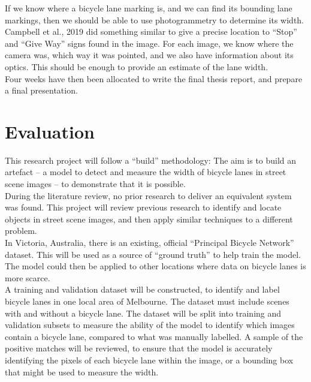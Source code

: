 \documentclass{article}
\begin{document}
If we know where a bicycle lane marking is, and we can find its bounding lane markings, then we should be able to use photogrammetry to determine its width.  Campbell et al., 2019 \cite{CAMPBELL2019101350} did something similar to give a precise location to ``Stop'' and ``Give Way'' signs found in the image.  For each image, we know where the camera was, which way it was pointed, and we also have information about its optics.  This should be enough to provide an estimate of the lane width. \\

Four weeks have then been allocated to write the final thesis report, and prepare a final presentation.


\section{Evaluation}

This research project will follow a ``build'' methodology:  The aim is to build an artefact -- a model to detect and measure the width of bicycle lanes in street scene images -- to demonstrate that it is possible.
\\

During the literature review, no prior research to deliver an equivalent system was found.  This project will review previous research to identify and locate objects in street scene images, and then apply similar techniques to a different problem.
\\

In Victoria, Australia, there is an existing, official ``Principal Bicycle Network'' dataset.  This will be used as a source of ``ground truth'' to help train the model.  The model could then be applied to other locations where data on bicycle lanes is more scarce.
\\

A training and validation dataset will be constructed, to identify and label bicycle lanes in one local area of Melbourne.  The dataset must include scenes with and without a bicycle lane.  The dataset will be split into training and validation subsets to measure the ability of the model to identify which images contain a bicycle lane, compared to what was manually labelled.  A sample of the positive matches will be reviewed, to ensure that the model is accurately identifying the pixels of each bicycle lane within the image, or a bounding box that might be used to measure the width.
\\
\end{document}
